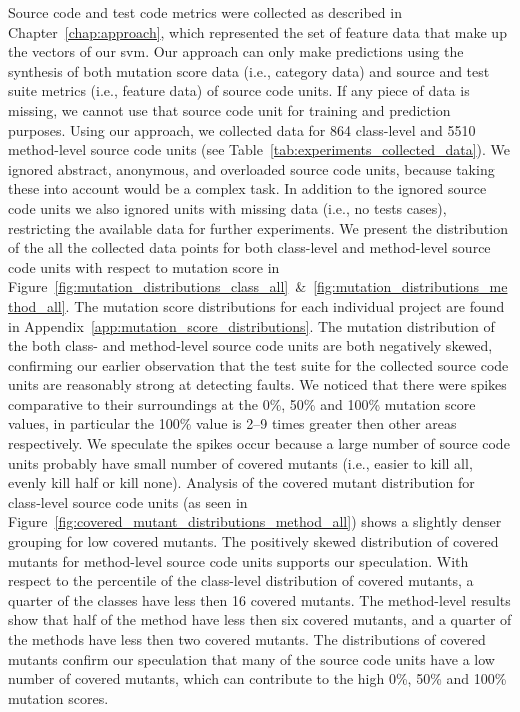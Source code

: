 Source code and test code metrics were collected as described in Chapter~\ref{chap:approach}, which represented the set of feature data that make up the vectors of our \gls{svm}. Our approach can only make predictions using the synthesis of both mutation score data (i.e., category data) and source and test suite metrics (i.e., feature data) of source code units. If any piece of data is missing, we cannot use that source code unit for training and prediction purposes. Using our approach, we collected data for 864 class-level and 5510 method-level source code units (see Table~\ref{tab:experiments_collected_data}). We ignored abstract, anonymous, and overloaded source code units, because taking these into account would be a complex task. In addition to the ignored source code units we also ignored units with missing data (i.e., no tests cases), restricting the available data for further experiments. We present the distribution of the all the collected data points for both class-level and method-level source code units with respect to mutation score in Figure~\ref{fig:mutation_distributions_class_all}~\&~\ref{fig:mutation_distributions_method_all}. The mutation score distributions for each individual project are found in Appendix~\ref{app:mutation_score_distributions}. The mutation distribution of the both class- and method-level source code units are both negatively skewed, confirming our earlier observation that the test suite for the collected source code units are reasonably strong at detecting faults. We noticed that there were spikes comparative to their surroundings at the  0\%, 50\% and 100\% mutation score values, in particular the 100\% value is 2--9 times greater then other areas respectively. We speculate the spikes occur because a large number of source code units probably have small number of covered mutants (i.e., easier to kill all, evenly kill half or kill none). Analysis of the covered mutant distribution for class-level source code units (as seen in Figure~\ref{fig:covered_mutant_distributions_method_all}) shows a slightly denser grouping for low covered mutants. The positively skewed distribution of covered mutants for method-level source code units supports our speculation. With respect to the percentile of the class-level distribution of covered mutants, a quarter of the classes have less then 16 covered mutants. The method-level results show that half of the method have less then six covered mutants, and a quarter of the methods have less then two covered mutants. The distributions of covered mutants confirm our speculation that many of the source code units have a low number of covered mutants, which can contribute to the high 0\%, 50\% and 100\% mutation scores.

